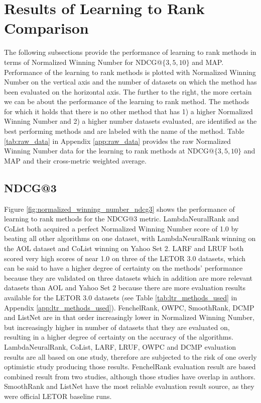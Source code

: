 \documentclass{sig-alternate}
\begin{document}
\section{Results of Learning to Rank Comparison}
The following subsections provide the performance of learning to rank methods in terms of Normalized Winning Number for NDCG@$\{3,5,10\}$ and MAP. Performance of the learning to rank methods is plotted with Normalized Winning Number on the vertical axis and the number of datasets on which the method has been evaluated on the horizontal axis. The further to the right, the more certain we can be about the performance of the learning to rank method. The methods for which it holds that there is no other method that has 1) a higher Normalized Winning Number and 2) a higher number datasets evaluated, are identified as the best performing methods and are labeled with the name of the method. Table \ref{tab:raw_data} in Appendix \ref{app:raw_data} provides the raw Normalized Winning Number data for the learning to rank methods at NDCG@$\{3,5,10\}$ and MAP and their cross-metric weighted average.

\subsection{NDCG@3}
Figure \ref{fig:normalized_winning_number_ndcg3} shows the performance of learning to rank methods for the NDCG@3 metric. LambdaNeuralRank and CoList both acquired a perfect Normalized Winning Number score of 1.0 by beating all other algorithms on one dataset, with LambdaNeuralRank winning on the AOL dataset and CoList winning on Yahoo Set 2. LARF and LRUF both scored very high scores of near 1.0 on three of the LETOR 3.0 datasets, which can be said to have a higher degree of certainty on the methods' performance because they are validated on three datasets which in addition are more relevant datasets than AOL and Yahoo Set 2 because there are more evaluation results available for the LETOR 3.0 datasets (see Table \ref{tab:ltr_methods_used} in Appendix \ref{app:ltr_methods_used}). FenchelRank, OWPC, SmoothRank, DCMP and ListNet are in that order increasingly lower in Normalized Winning Number, but increasingly higher in number of datasets that they are evaluated on, resulting in a higher degree of certainty on the accuracy of the algorithms.\\

LambdaNeuralRank, CoList, LARF, LRUF, OWPC and DCMP evaluation results are all based on one study, therefore are subjected to the risk of one overly optimistic study producing those results. FenchelRank evaluation result are based combined result from two studies, although those studies have overlap in authors. SmoothRank and ListNet have the most reliable evaluation result source, as they were official LETOR baseline runs.  
\end{document}
